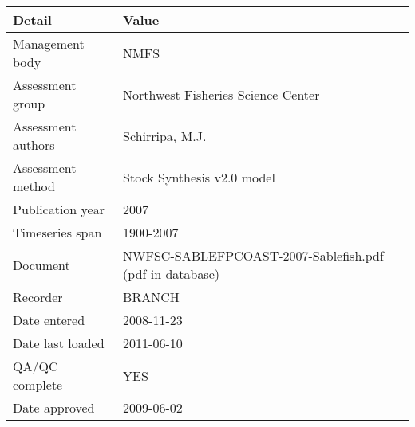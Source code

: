 \begin{table}[htb]
\centering
\begin{tabular}{lp{7cm}}
\toprule
Detail & Value \\
\midrule
Management body    & NMFS                                                    \\
Assessment group   & Northwest Fisheries Science Center                      \\
Assessment authors & Schirripa, M.J.                                         \\
Assessment method  & Stock Synthesis v2.0 model                              \\
Publication year   & 2007                                                    \\
Timeseries span    & 1900-2007                                               \\
Document           & NWFSC-SABLEFPCOAST-2007-Sablefish.pdf (pdf in database) \\
Recorder           & BRANCH                                                  \\
Date entered       & 2008-11-23                                              \\
Date last loaded   & 2011-06-10                                              \\
QA/QC complete     & YES                                                     \\
Date approved      & 2009-06-02                                              \\
\bottomrule
\end{tabular}
\label{tab:assessdet}
\end{table}
